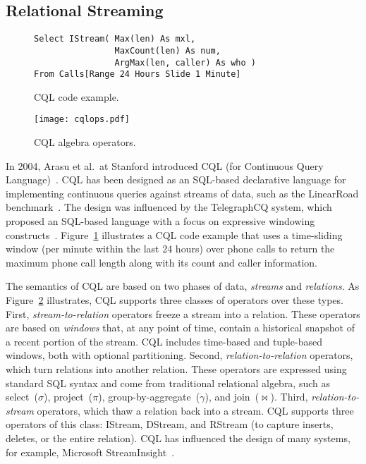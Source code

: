 \subsection{Relational Streaming}\label{sec:sql} %

\begin{figure}[!h]
\begin{lstlisting}[morekeywords={Select,IStream,As,From,Range,Slide}]
Select IStream( Max(len) As mxl,
                MaxCount(len) As num,
                ArgMax(len, caller) As who )
From Calls[Range 24 Hours Slide 1 Minute]
\end{lstlisting}
\vspace*{-4mm}
\caption{\label{fig:cql}CQL code example.}
\end{figure}

\begin{figure}
\centerline{\texttt{[image: cqlops.pdf]}}
\vspace*{-4mm}
\caption{\label{fig:cqlops}CQL algebra operators.}
\end{figure}

In 2004, Arasu et al.\ at Stanford introduced CQL (for Continuous
Query Language)~\cite{arasu_widom_2004}. CQL has been designed as an
SQL-based declarative language for implementing continuous queries
against streams of data, such as the LinearRoad
benchmark~\cite{arasu_et_al_2004}. The design was influenced by the
TelegraphCQ system, which proposed an SQL-based language with a
focus on expressive windowing
constructs~\cite{chandrasekaran_et_al_2003}.
Figure~\ref{fig:cql} illustrates a CQL code example that
uses a time-sliding window (per minute within the last 24 hours) over
phone calls to return the maximum phone call length along with its
count and caller information.

The semantics of CQL are
based on two phases of data, \emph{streams} and \emph{relations}.
As Figure~\ref{fig:cqlops} illustrates, CQL
supports three classes of operators over these types. First,
\emph{stream-to-relation} operators freeze a stream into a relation.
These operators are based on
\emph{windows} that, at any point of time, contain a
historical snapshot of a recent portion of the stream. CQL includes
time-based and tuple-based windows, both with optional
partitioning. Second, \emph{relation-to-relation} operators, which
turn relations into another relation. These operators are expressed
using standard SQL syntax and come from traditional relational
algebra, such as select~($\sigma$), project~($\pi$),
group-by-aggregate~($\gamma$), and join~($\bowtie$).
Third, \emph{rela\-tion-to-stream} operators, which thaw a relation
back into a stream. CQL supports three operators of this class:
IStream, DStream, and RStream (to capture inserts, deletes, or the entire
relation).  CQL has influenced the design of many
systems, for example, Microsoft StreamInsight~\cite{ali_et_al_2009}.

